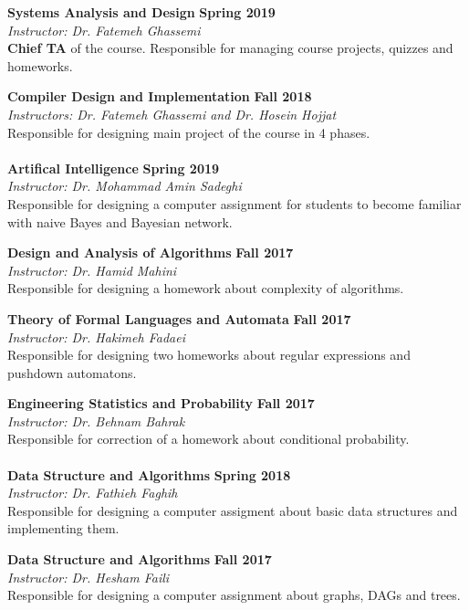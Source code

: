 \documentclass[line, mm]{sampleCV}
\begin{document}
\begin{resume}
\textbf{Systems Analysis and Design} \hfill \textbf{Spring 2019}\\
{\it Instructor:  Dr. Fatemeh Ghassemi}
\\
\textbf{Chief TA} of the course. Responsible for managing course projects, quizzes and homeworks.

\textbf{Compiler Design and Implementation} \hfill \textbf{Fall 2018}\\
{\it Instructors:  Dr. Fatemeh Ghassemi and Dr. Hosein Hojjat}\\
Responsible for designing main project of the course in 4 phases.\\ \\
\textbf{Artifical Intelligence} \hfill \textbf{Spring 2019}\\
{\it Instructor:  Dr. Mohammad Amin Sadeghi} \\
Responsible for designing a computer assignment for students to become familiar with naive Bayes and Bayesian network.

\textbf{Design and Analysis of Algorithms} \hfill \textbf{Fall 2017}\\
{\it Instructor:  Dr. Hamid Mahini}\\
Responsible for designing a homework about complexity of  algorithms.

\textbf{Theory of Formal Languages and Automata} \hfill \textbf{Fall 2017}\\
{\it Instructor:  Dr. Hakimeh Fadaei}\\ 
Responsible for designing two homeworks about regular expressions and pushdown automatons.

\textbf{Engineering Statistics and Probability} \hfill \textbf{Fall 2017}\\
{\it Instructor:  Dr. Behnam Bahrak}\\
Responsible for correction of a homework about conditional probability. \\ \\
\textbf{Data Structure and Algorithms} \hfill \textbf{Spring 2018}\\
{\it Instructor:  Dr. Fathieh Faghih}\\
Responsible for designing a computer assigment about basic data structures and implementing them.

\textbf{Data Structure and Algorithms} \hfill \textbf{Fall 2017}\\
{\it Instructor:  Dr. Hesham Faili}\\
Responsible for designing a computer assignment about graphs, DAGs and trees.




\end{resume}
\end{document}
